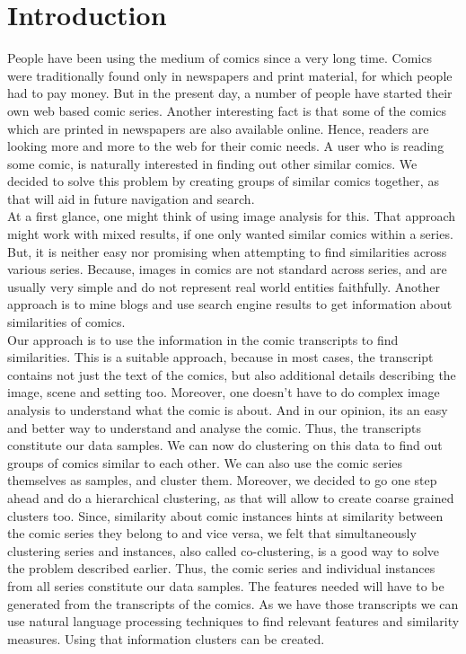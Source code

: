 \documentclass[11pt]{article}
\begin{document}
\section{Introduction}
People have been using the medium of comics since a very long time. Comics were traditionally found only in newspapers and print material, for which people had to pay money. But in the present day, a number of people have started their own web based comic series. Another interesting fact is that some of the comics which are printed in newspapers are also available online. Hence, readers are looking more and more to the web for their comic needs. A user who is reading some comic, is naturally interested in finding out other similar comics. We decided to solve this problem by creating groups of similar comics together, as that will aid in future navigation and search.\\
At a first glance, one might think of using image analysis for this. That approach might work with mixed results, if one only wanted similar comics within a series. But, it is neither easy nor promising when attempting to find similarities across various series. Because, images in comics are not standard across series, and are usually very simple and do not represent real world entities faithfully. Another approach is to mine blogs and use search engine results to get information about similarities of comics.\\
Our approach is to use the information in the comic transcripts to find similarities. This is a suitable approach, because in most cases, the transcript contains not just the text of the comics, but also additional details describing the image, scene and setting too. Moreover, one doesn't have to do complex image analysis to understand what the comic is about. And in our opinion, its an easy and better way to understand and analyse the comic. Thus, the transcripts constitute our data samples. We can now do clustering on this data to find out groups of comics similar to each other. We can also use the comic series themselves as samples, and cluster them. Moreover, we decided to go one step ahead and do a hierarchical clustering, as that will allow to create coarse grained clusters too. Since, similarity about comic instances hints at similarity between the comic series they belong to and vice versa, we felt that simultaneously clustering series and instances, also called co-clustering, is a good way to solve the problem described earlier. Thus, the comic series and individual instances from all series constitute our data samples. The features needed will have to be generated from the transcripts of the comics. As we have those transcripts we can use natural language processing techniques to find relevant features and similarity measures. Using that information clusters can be created.\\
\end{document}

